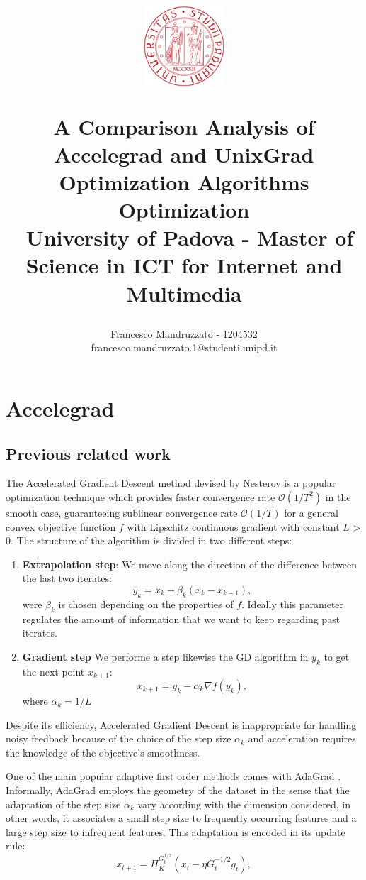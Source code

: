 \documentclass[12pt]{article}
\title{
\centerline{\includegraphics[width=30mm]{figures/unipd-logo.png}}
\vspace{0.2 cm}
A Comparison Analysis of Accelegrad and UnixGrad Optimization Algorithms \\
\vspace{0.3 cm}
Optimization
\large  \\
\
\small University of Padova - Master of Science in ICT for Internet and Multimedia
  }
\author{
    Francesco Mandruzzato - 1204532\\
    \small{francesco.mandruzzato.1@studenti.unipd.it}
}
\theoremstyle{definition}
\begin{document}
\maketitle

\section{Accelegrad}

\subsection{Previous related work}

The Accelerated Gradient Descent method devised by Nesterov is a popular optimization technique which provides faster convergence rate $\mathcal{O}(1/T^2)$ in the smooth case, guaranteeing sublinear convergence rate $\mathcal{O}(1/T)$ for a general convex objective function $f$ with Lipschitz continuous gradient with constant $L$ > 0. The structure of the algorithm is divided in two different steps:

\begin{enumerate}
  \item \textbf{Extrapolation step}: We move along the direction of the difference between the last two iterates:
  	  \begin{equation}
  			y_k = x_k + \beta_k(x_k - x_{k-1}),
	  \end{equation}
	  were $\beta_k$ is chosen depending on the properties of $f$. Ideally this parameter regulates the amount of information that we want to keep regarding past iterates.
  \item \textbf{Gradient step} We performe a step likewise the GD algorithm in $y_k$ to get the next point $x_{k+1}$:
  	  \begin{equation}
  			x_{k+1} = y_k - \alpha_k \nabla f(y_k),
	  \end{equation} 
	  where $\alpha_k = 1/L$ 
\end{enumerate}

Despite its efficiency, Accelerated Gradient Descent is inappropriate for handling noisy feedback because of the choice of the step size $\alpha_k$ and acceleration requires the knowledge of the objective's smoothness.

One of the main popular adaptive first order methods comes with AdaGrad \cite{adagrad}. Informally, AdaGrad employs the geometry of the dataset in the sense that the adaptation of the step size $\alpha_k$ vary according with the dimension considered, in other words, it associates a small step size to frequently occurring features and a large step size to infrequent features. This adaptation is encoded in its update rule:
\begin{equation}
  x_{t+1} = \Pi_K^{G_t^{1/2}} (x_t - \eta G_t^{-1/2} g_t ),
\end{equation}
\end{document}
